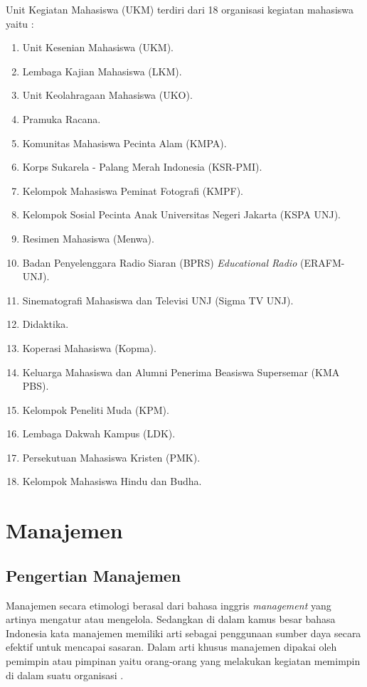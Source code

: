 Unit Kegiatan Mahasiswa (UKM) terdiri dari 18 organisasi kegiatan mahasiswa yaitu :
\begin{enumerate}
	\item Unit Kesenian Mahasiswa (UKM).
	\item Lembaga Kajian Mahasiswa (LKM).
	\item Unit Keolahragaan Mahasiswa (UKO).
	\item Pramuka Racana.
	\item Komunitas Mahasiswa Pecinta Alam (KMPA).
	\item Korps Sukarela - Palang Merah Indonesia (KSR-PMI).
	\item Kelompok Mahasiswa Peminat Fotografi (KMPF).
	\item Kelompok Sosial Pecinta Anak Universitas Negeri Jakarta (KSPA UNJ).
	\item Resimen Mahasiswa (Menwa).
	\item Badan Penyelenggara Radio Siaran (BPRS) \textit{Educational Radio} (ERAFM-UNJ).
	\item Sinematografi Mahasiswa dan Televisi UNJ (Sigma TV UNJ).
	\item Didaktika.
	\item Koperasi Mahasiswa (Kopma).
	\item Keluarga Mahasiswa dan Alumni Penerima Beasiswa Supersemar (KMA PBS). 
	\item Kelompok Peneliti Muda (KPM).
	\item Lembaga Dakwah Kampus (LDK).
	\item Persekutuan Mahasiswa Kristen (PMK).
	\item Kelompok Mahasiswa Hindu dan Budha.
\end{enumerate} 

\section{Manajemen}

\subsection{Pengertian Manajemen}

Manajemen secara etimologi berasal dari bahasa inggris \emph{management} yang artinya mengatur atau mengelola. Sedangkan di dalam kamus besar bahasa Indonesia kata manajemen memiliki arti sebagai penggunaan sumber daya secara efektif untuk mencapai sasaran. Dalam arti khusus manajemen dipakai oleh pemimpin atau pimpinan yaitu orang-orang yang melakukan kegiatan memimpin di dalam suatu organisasi \cite{syamsuddin}. 

